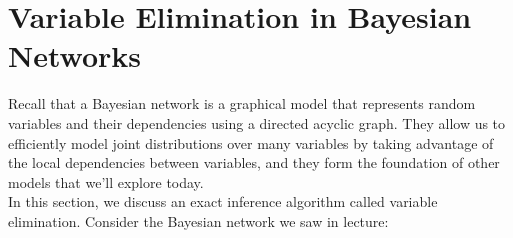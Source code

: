 \documentclass[12pt]{article}
\begin{document}
%		
%		
%		
%		
%		
%


\section{Variable Elimination in Bayesian Networks}
Recall that a Bayesian network is a graphical model that represents random variables and their dependencies using a directed acyclic graph. They allow us to efficiently model joint distributions over many variables by taking advantage of the local dependencies between variables, and they form the foundation of other models that we'll explore today.\\

In this section, we discuss an exact inference algorithm called variable elimination. Consider the Bayesian network we saw in lecture:
\end{document}
